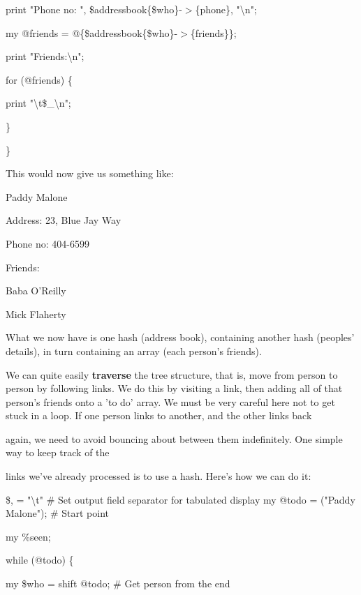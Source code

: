 \documentclass[a4paper,11pt]{book}
\begin{document}
\noindent print "Phone no: ", \$addressbook\{\$who\}-$>$\{phone\}, "\textbackslash n";

\noindent my @friends = @\{\$addressbook\{\$who\}-$>$\{friends\}\};

\noindent print "Friends:\textbackslash n";

\noindent for (@friends) \{

\noindent print "\textbackslash t\$\_\textbackslash n";

\noindent \}

\noindent \}

\noindent 

\noindent This would now give us something like:

\noindent 

\noindent Paddy Malone

\noindent Address:  23, Blue Jay Way

\noindent Phone no: 404-6599

\noindent Friends:

\noindent Baba O'Reilly

\noindent Mick Flaherty

\noindent 

\noindent What we now have is one hash (address book), containing another hash (peoples' details), in turn containing an array (each person's friends).

\noindent 

\noindent We can quite easily \textbf{traverse }the tree structure, that is, move from person to person by following links. We do this by visiting a link, then adding all of that person's friends onto a 'to do' array. We must be very careful here not to get stuck in a loop. If one person links to another, and the other links back

\noindent again, we need to avoid bouncing about between them indefinitely. One simple way to keep track of the

\noindent links we've already processed is to use a hash. Here's how we can do it:

\noindent 

\noindent 

\noindent \$, = "\textbackslash t" \# Set output field separator for tabulated display my @todo = ("Paddy Malone"); \# Start point

\noindent my \%seen;

\noindent while (@todo) \{

\noindent my \$who = shift @todo; \# Get person from the end
\end{document}
